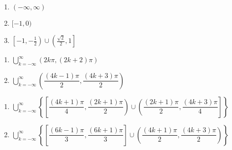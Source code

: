 \documentclass{ximera}
\begin{document}
\begin{multicols}{3}

\begin{enumerate}

\setcounter{enumi}{\value{HW}}


\item $(-\infty, \infty)$
\item $[-1,0)$ 
\item $\left[-1, -\frac{1}{2}\right) \cup \left( \frac{\sqrt{2}}{2}, 1\right]$

\setcounter{HW}{\value{enumi}}

\end{enumerate}

\end{multicols}

\begin{multicols}{2}

\begin{enumerate}

\setcounter{enumi}{\value{HW}}

\item $\displaystyle \bigcup_{k=-\infty}^{\infty} \left( 2k\pi, (2k+2)\pi \right)$
\item $\displaystyle \bigcup_{k=-\infty}^{\infty} \left( \dfrac{(4k - 1)\pi}{2}, \dfrac{(4k + 3)\pi}{2} \right)$

\setcounter{HW}{\value{enumi}}

\end{enumerate}

\end{multicols}

\begin{enumerate}

\setcounter{enumi}{\value{HW}}

\item $\displaystyle \bigcup_{k=-\infty}^{\infty} \left\{ \left[ \dfrac{(4k + 1)\pi}{4}, \dfrac{(2k + 1)\pi}{2} \right) \cup \left( \dfrac{(2k + 1)\pi}{2}, \dfrac{(4k + 3)\pi}{4} \right] \right\}$

\item $\displaystyle \bigcup_{k=-\infty}^{\infty} \left\{ \left[ \dfrac{(6k - 1)\pi}{3}, \dfrac{(6k + 1)\pi}{3} \right] \cup \left( \dfrac{(4k + 1)\pi}{2}, \dfrac{(4k + 3)\pi}{2} \right) \right\}$

\setcounter{HW}{\value{enumi}}

\end{enumerate}
\end{document}
